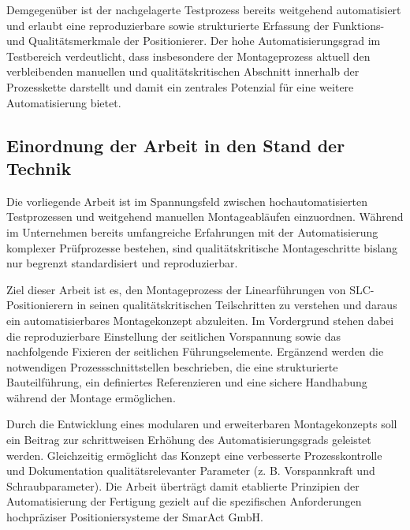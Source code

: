 Demgegenüber ist der nachgelagerte Testprozess bereits weitgehend automatisiert und erlaubt eine reproduzierbare sowie strukturierte Erfassung der Funktions- und Qualitätsmerkmale der Positionierer. Der hohe Automatisierungsgrad im Testbereich verdeutlicht, dass insbesondere der Montageprozess aktuell den verbleibenden manuellen und qualitätskritischen Abschnitt innerhalb der Prozesskette darstellt und damit ein zentrales Potenzial für eine weitere Automatisierung bietet.

\subsection{Einordnung der Arbeit in den Stand der Technik}
Die vorliegende Arbeit ist im Spannungsfeld zwischen hochautomatisierten Testprozessen und weitgehend manuellen Montageabläufen einzuordnen. Während im Unternehmen bereits umfangreiche Erfahrungen mit der Automatisierung komplexer Prüfprozesse bestehen, sind qualitätskritische Montageschritte bislang nur begrenzt standardisiert und reproduzierbar.

Ziel dieser Arbeit ist es, den Montageprozess der Linearführungen von SLC-Positionierern in seinen qualitätskritischen Teilschritten zu verstehen und daraus ein automatisierbares Montagekonzept abzuleiten. Im Vordergrund stehen dabei die reproduzierbare Einstellung der seitlichen Vorspannung sowie das nachfolgende Fixieren der seitlichen Führungselemente. Ergänzend werden die notwendigen Prozessschnittstellen beschrieben, die eine strukturierte Bauteilführung, ein definiertes Referenzieren und eine sichere Handhabung während der Montage ermöglichen.

Durch die Entwicklung eines modularen und erweiterbaren Montagekonzepts soll ein Beitrag zur schrittweisen Erhöhung des Automatisierungsgrads geleistet werden. Gleichzeitig ermöglicht das Konzept eine verbesserte Prozesskontrolle und Dokumentation qualitätsrelevanter Parameter (z. B. Vorspannkraft und Schraubparameter). Die Arbeit überträgt damit etablierte Prinzipien der Automatisierung der Fertigung gezielt auf die spezifischen Anforderungen hochpräziser Positioniersysteme der SmarAct GmbH.